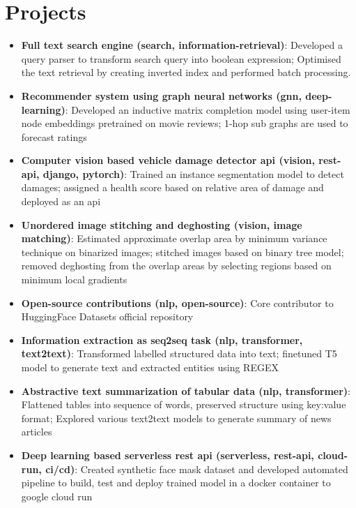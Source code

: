 \documentclass[a4paper,20pt]{article}
\newcommand{\resumeItem}[2]{
  \item\small{
    \textbf{#1}{: #2 \vspace{-2pt}}
  }
}
\newcommand{\resumeSubItem}[2]{\resumeItem{#1}{#2}\vspace{-3pt}}
\newcommand{\resumeSubHeadingListStart}{\begin{itemize}[leftmargin=*]}
\newcommand{\resumeSubHeadingListEnd}{\end{itemize}}
\begin{document}
\section{Projects}
\resumeSubHeadingListStart
\resumeSubItem{Full text search engine (search, information-retrieval)}{Developed a query parser to transform search query into boolean expression; Optimised the text retrieval by creating inverted index and performed batch processing.}
\vspace{2pt}
\resumeSubItem{Recommender system using graph neural networks (gnn, deep-learning)}{Developed an inductive matrix completion model using user-item node embeddings pretrained on movie reviews; 1-hop sub graphs are used to forecast ratings}
\vspace{2pt}
\resumeSubItem{Computer vision based vehicle damage detector api (vision, rest-api, django, pytorch)}{Trained an instance segmentation model to detect damages; assigned a health score based on relative area of damage and deployed as an api}
\vspace{2pt}
\resumeSubItem{Unordered image stitching and deghosting (vision, image matching)}{Estimated approximate overlap area by minimum variance technique on binarized images; stitched images based on binary tree model; removed deghosting from the overlap areas by selecting regions based on minimum local gradients}
\vspace{2pt}
\resumeSubItem{Open-source contributions (nlp, open-source)}{Core contributor to HuggingFace Datasets official repository}
\vspace{2pt}
\resumeSubItem{Information extraction as seq2seq task (nlp, transformer, text2text)}{Transformed labelled structured data into text; finetuned T5 model to generate text and extracted entities using REGEX}
\vspace{2pt}
\resumeSubItem{Abstractive text summarization of tabular data (nlp, transformer)}{Flattened tables into sequence of words, preserved structure using key:value format; Explored various text2text models to generate summary of news articles}
\vspace{2pt}
\resumeSubItem{Deep learning based serverless rest api (serverless, rest-api, cloud-run, ci/cd)}{Created synthetic face mask dataset and developed automated pipeline to build, test and deploy trained model in a docker container to google cloud run}
\resumeSubHeadingListEnd
\vspace{-5pt}

\end{document}
